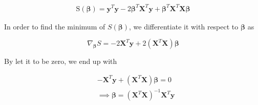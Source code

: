  \begin{equation}
 	\begin{split}
 		\text{S}(\boldsymbol{\beta})=\boldsymbol{y}^T\boldsymbol{y}-2\boldsymbol{\beta}^T\boldsymbol{X}^T\boldsymbol{y}+\boldsymbol{\beta}^T\boldsymbol{X}^T\boldsymbol{X}\boldsymbol{\beta}
 	\end{split}
 \end{equation}
 
 In order to find the minimum of $S(\boldsymbol{\beta})$, we differentiate it with respect to $\boldsymbol{\beta}$ as 
 
 \begin{equation}
 	\nabla_{\boldsymbol{\beta}}S=-2\boldsymbol{X}^T\boldsymbol{y}+2(\boldsymbol{X}^T\boldsymbol{X})\boldsymbol{\beta}
 \end{equation}
 
 By let it to be zero, we end up with 
 
 \begin{equation}
 \begin{split}
 	 &	-\boldsymbol{X}^T\boldsymbol{y}+(\boldsymbol{X}^T\boldsymbol{X})\boldsymbol{\beta}=0 \\
 	& \implies \boldsymbol{\beta}= (\boldsymbol{X}^T\boldsymbol{X})^{-1}\boldsymbol{X}^T\boldsymbol{y}
 \end{split}
 \end{equation}
